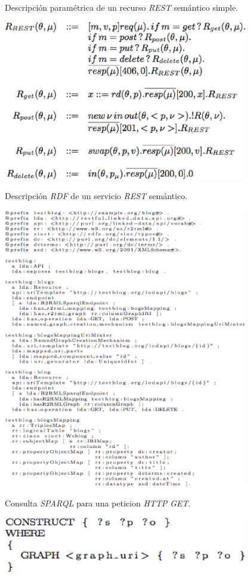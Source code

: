 \begin{table}
\vspace{2.4in}
\caption{Descripci\'on param\'etrica de un recurso \textit{REST} sem\'antico simple.}
\includegraphics[width=0.8\textwidth]{tabla4}
\label{tabla4}
\end{table}
\clearpage
\newpage

\begin{table}
\vspace{2.4in}
\caption{Descripci\'on \textit{RDF} de un servicio \textit{REST} sem\'antico.}
\includegraphics[width=0.8\textwidth]{tabla5}
\label{tabla5}
\end{table}
\clearpage
\newpage

\begin{table}
\vspace{2.4in}
\caption{Consulta \textit{SPARQL} para una peticion \textit{HTTP} \textit{GET}.}
\includegraphics[width=0.8\textwidth]{tabla6}
\label{tabla6}
\end{table}
\clearpage
\newpage


